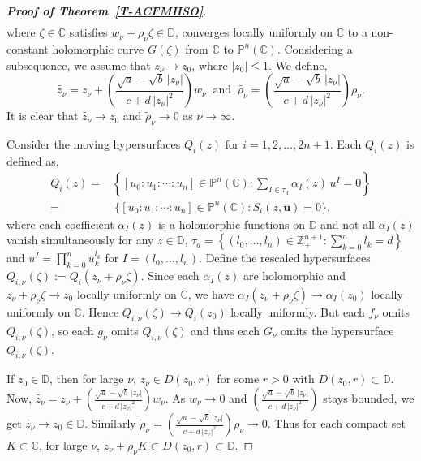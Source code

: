 \documentclass[11pt, reqno]{amsart}
\theoremstyle{definition}
\theoremstyle{remark}
\numberwithin{equation}{section}
\begin{document}
\begin{proof}[{\bf Proof of Theorem~\ref{T-ACFMHSO}}]
\begin{align*}
\end{align*}
where $\zeta\in\mathbb C$ satisfies $w_{\nu}+\rho_{\nu}\zeta\in\mathbb D$, converges locally 
uniformly on $\mathbb C$ to a non-constant holomorphic curve $G(\zeta)$ from $\mathbb C$ to $\mathbb P^n(\mathbb C)$. 
Considering a subsequence, we assume that $z_{\nu}\to z_0$, where $|z_0|\leq 1$. We define,
$$\widetilde{z_{\nu}}=z_{\nu}+\left(\frac{\sqrt{a}-\sqrt{b}\,|z_{\nu}|}{c+d\,|z_{\nu}|^2}\right)w_{\nu}\ \text{ and }\ \widetilde{\rho_{\nu}}=\left(\frac{\sqrt{a}-\sqrt{b}\,|z_{\nu}|}{c+d\,|z_{\nu}|^2}\right)\rho_{\nu}.$$ 
It is clear that $\widetilde{z_{\nu}}\to z_0$ and $\widetilde\rho_{\nu}\to 0$ as $\nu\to\infty$.\smallskip

Consider the moving hypersurfaces $Q_i(z)$ for $i=1,2,\dots,2n+1$. Each $Q_i(z)$ is defined as,
 \begin{align*}Q_i(z)=&\left\{[u_0:u_1:\cdots:u_n]\in\mathbb P^n(\mathbb C):\sum_{I\in \tau_d} \alpha_I(z)\, u^I=0\right\}\\ =&~\{[u_0:u_1:\cdots:u_n]\in\mathbb P^n(\mathbb C):S_i(z,\mathbf{u})=0\},\end{align*}
where each coefficient $\alpha_I(z)$ is a holomorphic functions 
on $\mathbb{D}$ and not all $\alpha_I(z)$ vanish simultaneously for any $z\in \mathbb D$, $\tau_d = \left\{ (l_0,\ldots,l_n) \in \mathbb Z_{+}^{n+1} : \sum_{k=0}^n l_k= d \right\}$ 
and $u^I = \prod_{k=0}^nu_k^{l_k}$ for 
$I = (l_0,\ldots,l_n)$. Define the rescaled hypersurfaces $Q_{i,\nu}(\zeta):=Q_i(z_{\nu}+\rho_{\nu}\zeta)$. Since each $\alpha_I(z)$ are holomorphic and $z_{\nu}+\rho_{\nu}\zeta\to z_0$ locally uniformly on $\mathbb C$, 
we have $\alpha_I(z_{\nu}+\rho_{\nu}\zeta)\to \alpha_I(z_0)$ locally uniformly on $\mathbb C$. Hence $Q_{i,\nu}(\zeta)\to Q_i(z_0)$ locally uniformly. 
But each $f_{\nu}$ omits $Q_{i,\nu}(\zeta)$, so each $g_{\nu}$ omits $Q_{i,\nu}(\zeta)$ and thus each $G_{\nu}$ omits the hypersurface $Q_{i,\nu}(\zeta)$. \smallskip

If $z_0\in\mathbb D$, then for large $\nu$, $z_{\nu}\in D(z_0,r)$ for some $r>0$ with $D(z_0,r)\subset \mathbb D$. 
Now, $\widetilde{z_{\nu}}=z_{\nu}+\left(\frac{\sqrt{a}-\sqrt{b}\,|z_{\nu}|}{c+d\,|z_{\nu}|^2}\right)w_{\nu}$. As 
$w_{\nu}\to 0$ and $\left(\frac{\sqrt{a}-\sqrt{b}\,|z_{\nu}|}{c+d\,|z_{\nu}|^2}\right)$ stays bounded, we get 
$\widetilde{z_{\nu}}\to z_0\in\mathbb D$. Similarly $\widetilde \rho_{\nu}=\left(\frac{\sqrt{a}-\sqrt{b}\,|z_{\nu}|}{c+d\,|z_{\nu}|^2}\right)\rho_{\nu}\to 0$.
Thus for each compact set $K\subset\mathbb C$, for large $\nu$, $\widetilde z_{\nu} +\widetilde \rho_{\nu} K\subset D(z_0,r)\subset \mathbb D$. \smallskip


\end{proof}
\end{document}
